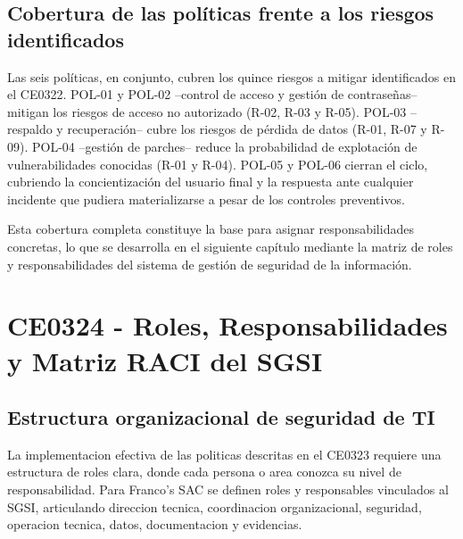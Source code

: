 \documentclass[11pt, a4paper, oneside]{report}
\begin{document}
\normalsize

\section{Cobertura de las políticas frente a los riesgos identificados}

Las seis políticas, en conjunto, cubren los quince riesgos a mitigar identificados en el CE0322. POL-01 y POL-02 --control de acceso y gestión de contraseñas-- mitigan los riesgos de acceso no autorizado (R-02, R-03 y R-05). POL-03 --respaldo y recuperación-- cubre los riesgos de pérdida de datos (R-01, R-07 y R-09). POL-04 --gestión de parches-- reduce la probabilidad de explotación de vulnerabilidades conocidas (R-01 y R-04). POL-05 y POL-06 cierran el ciclo, cubriendo la concientización del usuario final y la respuesta ante cualquier incidente que pudiera materializarse a pesar de los controles preventivos.

Esta cobertura completa constituye la base para asignar responsabilidades concretas, lo que se desarrolla en el siguiente capítulo mediante la matriz de roles y responsabilidades del sistema de gestión de seguridad de la información.

\chapter{CE0324 - Roles, Responsabilidades y Matriz RACI del SGSI}

\section{Estructura organizacional de seguridad de TI}

La implementacion efectiva de las politicas descritas en el CE0323 requiere una estructura de roles clara, donde cada persona o area conozca su nivel de responsabilidad. Para Franco's SAC se definen roles y responsables vinculados al SGSI, articulando direccion tecnica, coordinacion organizacional, seguridad, operacion tecnica, datos, documentacion y evidencias.

\renewcommand{\arraystretch}{1.3}
\footnotesize
{}
\end{document}
